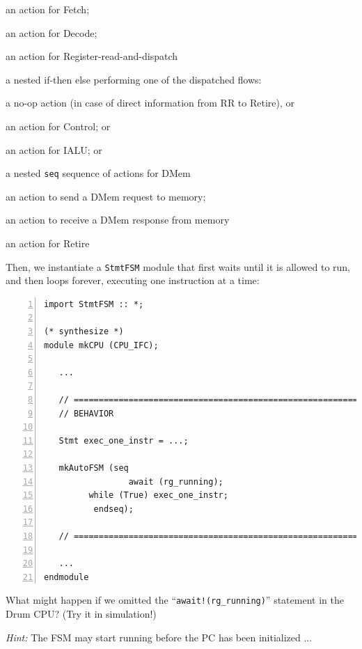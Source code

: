 \begin{tightlist}
  \item an action for Fetch;
  \item an action for Decode;
  \item an action for Register-read-and-dispatch
  \item a nested if-then else performing one of the dispatched flows:
    \begin{tightlist}
      \item a no-op action (in case of direct information from RR to Retire), or
      \item an action for Control; or
      \item an action for IALU; or
      \item a nested \verb|seq| sequence of actions for DMem
        \begin{tightlist}
          \item an action to send a DMem request to memory;
          \item an action to receive a DMem response from memory
        \end{tightlist}
    \end{tightlist}
  \item an action for Retire
\end{tightlist}

Then, we instantiate a \verb|StmtFSM| module that first waits until it
is allowed to run, and then loops forever, executing one instruction
at a time:

{\small
\begin{Verbatim}[frame=single, numbers=left]
import StmtFSM :: *;

(* synthesize *)
module mkCPU (CPU_IFC);

   ...

   // ================================================================
   // BEHAVIOR

   Stmt exec_one_instr = ...;

   mkAutoFSM (seq
                 await (rg_running);
		 while (True) exec_one_instr;
	      endseq);

   // ================================================================

   ...
endmodule
\end{Verbatim}
}

\hdivider

\Exercise

What might happen if we omitted the ``{\tt await!(rg\_running)}''
statement in the Drum CPU? (Try it in simulation!)

\emph{Hint:} The FSM may start running before the PC has been initialized ...

\Endexercise

